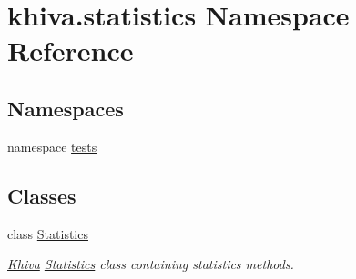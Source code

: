 \hypertarget{namespacekhiva_1_1statistics}{}\section{khiva.\+statistics Namespace Reference}
\label{namespacekhiva_1_1statistics}
\subsection*{Namespaces}
\begin{DoxyCompactItemize}
\item 
namespace \mbox{\hyperlink{namespacekhiva_1_1statistics_1_1tests}{tests}}
\end{DoxyCompactItemize}
\subsection*{Classes}
\begin{DoxyCompactItemize}
\item 
class \mbox{\hyperlink{classkhiva_1_1statistics_1_1_statistics}{Statistics}}
\begin{DoxyCompactList}\small\item\em \mbox{\hyperlink{classkhiva_1_1_khiva}{Khiva}} \mbox{\hyperlink{classkhiva_1_1statistics_1_1_statistics}{Statistics}} class containing statistics methods. \end{DoxyCompactList}\end{DoxyCompactItemize}
